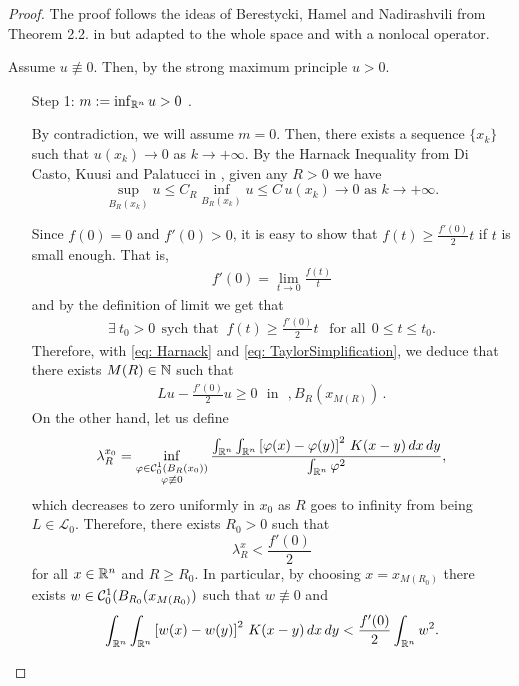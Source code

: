 \begin{proof}
The proof follows the ideas of Berestycki, Hamel and Nadirashvili from Theorem 2.2. in \cite{BerestyckiHamelNadi} but adapted to the whole space and with a nonlocal operator.

Assume $u\not\equiv 0$. Then, by the strong maximum principle $u>0$.
\begin{enumerate}
\item[Step 1:] $m:=\inf_{\mathbb{R}^n} u >0$ .

By contradiction, we will assume $m=0$. Then, there exists a sequence $\{x_k\}$ such that $u(x_k)\rightarrow 0$ as $k \rightarrow +\infty$. By the Harnack Inequality  from Di Casto, Kuusi and Palatucci in \cite{DiCastoKuusiPalatucci}, given any $R>0$ we have
\begin{equation}
\label{eq: Harnack}
\sup_{B_R(x_k)}u \leq C_R \inf_{B_R(x_k)}u \leq C \, u(x_k) \rightarrow 0 \,\,\text{as}\,\, k\rightarrow +\infty.
\end{equation}


Since $f(0) = 0 $ and $f'(0)>0$, it is easy to show that $f(t)\geq \frac{f'(0)}{2}t$ if $t$ is small enough. That is,
\begin{align*}
f'(0) = \lim_{t\to 0} \frac{f(t)}{t}
\end{align*}
and by the definition of limit we get that 
\begin{align}
\label{eq: TaylorSimplification}
\exists \ t_0>0 \ \ \textrm{sych that } \ f(t)\geq \frac{f'(0)}{2}t \ \ \textrm{ for all} \ \ 0\leq t\leq t_0.
\end{align}
Therefore, with \eqref{eq: Harnack} and \eqref{eq: TaylorSimplification}, we deduce that there exists $M(R)\in\mathbb{N}$ such that
\begin{align}
\label{eq:WholeSpace2}
L u - \frac{f'(0)}{2}u \geq 0 \,\,\textrm{ in }\,\,,B_R(x_{M(R)})\,. 
\end{align}
On the other hand, let us define
$$ \lambda_R^{x_0} = \inf_{\substack{\varphi\in\mathcal{C}^{1}_{0}(B_R(x_0))\\ \varphi\not\equiv 0}} \frac{\int_{\mathbb{R}^n}\int_{\mathbb{R}^n}\left[\varphi(x)-\varphi(y)\right]^2\,K(x-y)\,dx\,dy}{\int_{\mathbb{R}^n}\varphi^2}, $$
which decreases to zero uniformly in $x_0$ as $R$ goes to infinity from being $L\in\mathcal{L}_0$. Therefore, there exists $R_0>0$ such that
$$ \lambda_R^x < \frac{f'(0)}{2} $$
for all $x\in \mathbb{R}^n$ and $R\geq R_0$. In particular, by choosing $x=x_{M(R_0)}$ there exists $w\in\mathcal{C}^{1}_0(B_{R_0}(x_{M(R_0)})$ such that $w\not\equiv 0$ and
\begin{equation}
\label{Eq:Eigenfunction}
\int_{\mathbb{R}^n}\int_{\mathbb{R}^n}\left[w(x)-w(y)\right]^2\,K(x-y)\,dx\,dy < \frac{f'(0)}{2}\int_{\mathbb{R}^n}w^2.
\end{equation}


\end{enumerate}
\end{proof}
